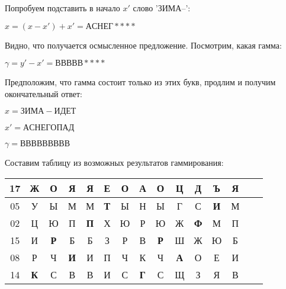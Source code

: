 \documentclass[letterpaper,11pt,openany]{book}
\begin{document}
Попробуем подставить в начало $x'$ слово 'ЗИМА--':

\noindent $x = (x - x') + x' = АСНЕГ * * * *$

Видно, что получается осмысленное предложение. Посмотрим, какая гамма:

$\gamma = y' - x' = ВВВВВ ****$

Предположим, что гамма состоит только из этих букв, продлим и получим окончательный ответ:

\noindent $x = ЗИМА-ИДЕТ$

\noindent $x' = АСНЕГОПАД$

\noindent $\gamma = ВВВВВВВВВ$


Составим таблицу из возможных результатов гаммирования:

\medskip

{\centering
\begin{tabular}{||c|c|c|c|c|c|c|c|c|c|c|c|c|c|c||}
\hline
17 & Ж & О & Я & Я & Е & \bf О & А & О & Ц & Д & Ъ & \bf Я \\
\hline
05 & У & Ы & М & М & \bf Т & Ы & Н & Ы & Г & С & \bf И & М \\
\hline
02 & Ц & Ю & П & \bf П & Х & Ю & Р & Ю & Ж & \bf Ф & М & П \\
\hline
15 & И & \bf Р & Б & Б & З & Р & В & \bf Р & Ш & Ж & Ю & Б \\
\hline
08 & Р & Ч & \bf И & И & П & Ч & К & Ч & \bf А & О & Е & И \\
\hline
14 & \bf К & С & В & В & И & С & \bf Г & С & Щ & З & Я & В \\
\hline
\end{tabular}
}
\medskip
\end{document}
